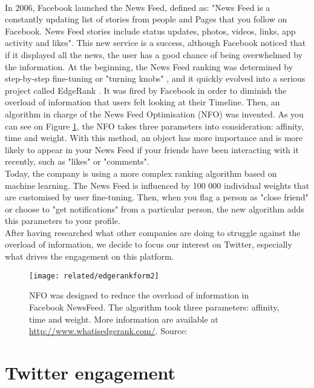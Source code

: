 \paragraph{}
In 2006, Facebook launched the News Feed, defined as: "News Feed is a constantly updating list of stories from people and Pages that you follow on Facebook. News Feed stories include status updates, photos, videos, links, app activity and likes". This new service is a success, although Facebook noticed that if it displayed all the news, the user has a good chance of being overwhelmed by the information. At the beginning, the News Feed ranking was determined by step-by-step fine-tuning or "turning knobs" \cite{f_EdgeRank2}, and it quickly evolved into a serious project called EdgeRank \cite{f_EdgeRank1}. It was fired by Facebook in order to diminish the overload of information that users felt looking at their Timeline. Then, an algorithm in charge of the News Feed Optimisation (NFO) was invented. As you can see on Figure \ref{fig:nfo}, the NFO takes three parameters into consideration: affinity, time and weight. With this method, an object has more importance and is more likely to appear in your News Feed if your friends have been interacting with it recently, such as "likes" or "comments".\\
Today, the company is using a more complex ranking algorithm based on machine learning. The News Feed is influenced by 100 000 individual weights that are customised by user fine-tuning. Then, when you flag a person as "close friend" or choose to "get notifications" from a particular person, the new algorithm adds this parameters to your profile. \\
After having researched what other companies are doing to struggle against the overload of information, we decide to focus our interest on Twitter, especially what drives the engagement on this platform.

\begin{figure}[tb] 
\centering 
\texttt{[image: related/edgerankform2]} 
\caption[News Feed Optimization formula]{NFO was designed to reduce the overload of information in Facebook NewsFeed. The algorithm took three parameters: affinity, time and weight. More information are available at \url{http://www.whatisedgerank.com/}. Source: \cite{f_EdgeRank3}}
\label{fig:nfo}
\end{figure}

\section{Twitter engagement}
